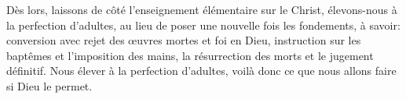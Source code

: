 Dès lors, laissons de côté l’enseignement élémentaire sur le Christ,
	élevons-nous à la perfection d’adultes,
	au lieu de poser une nouvelle fois les fondements,
	à savoir: conversion avec rejet des œuvres mortes et foi en Dieu,
	instruction sur les baptêmes et l’imposition des mains,
	la résurrection des morts et le jugement définitif.
Nous élever à la perfection d’adultes,
	voilà donc ce que nous allons faire si Dieu le permet.
